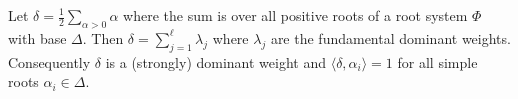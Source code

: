 Let $\delta = \frac{1}{2} \sum_{\alpha > 0} \alpha$ where the sum is over all positive roots of a root system $\Phi$ with base $\Delta$. Then $\delta = \sum_{j=1}^{\ell} \lambda_j$ where $\lambda_j$ are the fundamental dominant weights. Consequently $\delta$ is a (strongly) dominant weight and $\langle \delta, \alpha_i \rangle = 1$ for all simple roots $\alpha_i \in \Delta$.